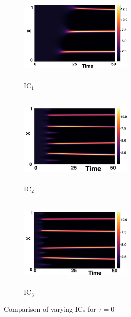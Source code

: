 \documentclass[12pt]{report}
\begin{document}
\begin{figure}[H]
    \centering
    \begin{subfigure}[b]{0.32\textwidth}
        \centering
        \includegraphics[width=5.5cm,height=4.5cm]{gaff0.png}
        \caption{$\text{IC}_1$}
        \label{}
    \end{subfigure}
    \hfill
    \begin{subfigure}[b]{0.32\textwidth}
        \centering
        \includegraphics[width=5.5cm,height=4.5cm]{ic20.png}
        \caption{$\text{IC}_2$}
        \label{}
    \end{subfigure}
    \hfill
    \begin{subfigure}[b]{0.32\textwidth}
        \centering
        \includegraphics[width=5.5cm,height=4.5cm]{ic30.png}
        \caption{$\text{IC}_3$}
        \label{}
    \end{subfigure}
    \caption{Comparison of varying ICs for $\tau=0$}
    \label{fig:figtau0}
\end{figure}
\end{document}
